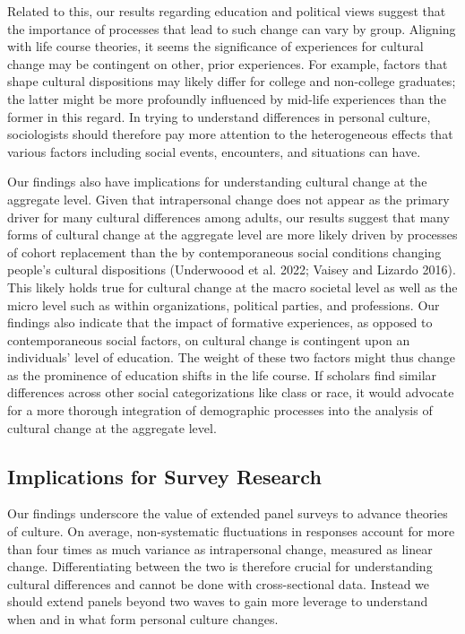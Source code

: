 \documentclass[
  12pt,
]{article}
\begin{document}
Related to this, our results regarding education and political views
suggest that the importance of processes that lead to such change can
vary by group. Aligning with life course theories, it seems the
significance of experiences for cultural change may be contingent on
other, prior experiences. For example, factors that shape cultural
dispositions may likely differ for college and non-college graduates;
the latter might be more profoundly influenced by mid-life experiences
than the former in this regard. In trying to understand differences in
personal culture, sociologists should therefore pay more attention to
the heterogeneous effects that various factors including social events,
encounters, and situations can have.

Our findings also have implications for understanding cultural change at
the aggregate level. Given that intrapersonal change does not appear as
the primary driver for many cultural differences among adults, our
results suggest that many forms of cultural change at the aggregate
level are more likely driven by processes of cohort replacement than the
by contemporaneous social conditions changing people's cultural
dispositions (Underwoood et al. 2022; Vaisey and Lizardo 2016). This
likely holds true for cultural change at the macro societal level as
well as the micro level such as within organizations, political parties,
and professions. Our findings also indicate that the impact of formative
experiences, as opposed to contemporaneous social factors, on cultural
change is contingent upon an individuals' level of education. The weight
of these two factors might thus change as the prominence of education
shifts in the life course. If scholars find similar differences across
other social categorizations like class or race, it would advocate for a
more thorough integration of demographic processes into the analysis of
cultural change at the aggregate level.

\hypertarget{implications-for-survey-research}{%
\subsection{Implications for Survey
Research}\label{implications-for-survey-research}}

Our findings underscore the value of extended panel surveys to advance
theories of culture. On average, non-systematic fluctuations in
responses account for more than four times as much variance as
intrapersonal change, measured as linear change. Differentiating between
the two is therefore crucial for understanding cultural differences and
cannot be done with cross-sectional data. Instead we should extend
panels beyond two waves to gain more leverage to understand when and in
what form personal culture changes.
\end{document}
